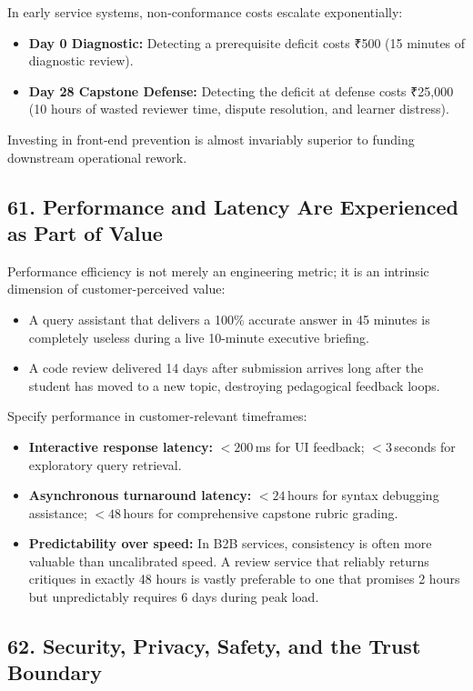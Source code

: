 In early service systems, non-conformance costs escalate exponentially:
\begin{itemize}[leftmargin=*]
\item \textbf{Day 0 Diagnostic:} Detecting a prerequisite deficit costs ₹500 (15 minutes of diagnostic review).
\item \textbf{Day 28 Capstone Defense:} Detecting the deficit at defense costs ₹25,000 (10 hours of wasted reviewer time, dispute resolution, and learner distress).
\end{itemize}

Investing in front-end prevention is almost invariably superior to funding downstream operational rework.

\subsection*{61. Performance and Latency Are Experienced as Part of Value}

Performance efficiency is not merely an engineering metric; it is an intrinsic dimension of customer-perceived value:
\begin{itemize}
    \item A query assistant that delivers a 100\% accurate answer in 45 minutes is completely useless during a live 10-minute executive briefing.
    \item A code review delivered 14 days after submission arrives long after the student has moved to a new topic, destroying pedagogical feedback loops.
\end{itemize}

Specify performance in customer-relevant timeframes:
\begin{itemize}
    \item \textbf{Interactive response latency:} $< 200$\,ms for UI feedback; $< 3$\,seconds for exploratory query retrieval.
    \item \textbf{Asynchronous turnaround latency:} $< 24$\,hours for syntax debugging assistance; $< 48$\,hours for comprehensive capstone rubric grading.
    \item \textbf{Predictability over speed:} In B2B services, consistency is often more valuable than uncalibrated speed. A review service that reliably returns critiques in exactly 48 hours is vastly preferable to one that promises 2 hours but unpredictably requires 6 days during peak load.
\end{itemize}

\subsection*{62. Security, Privacy, Safety, and the Trust Boundary}

